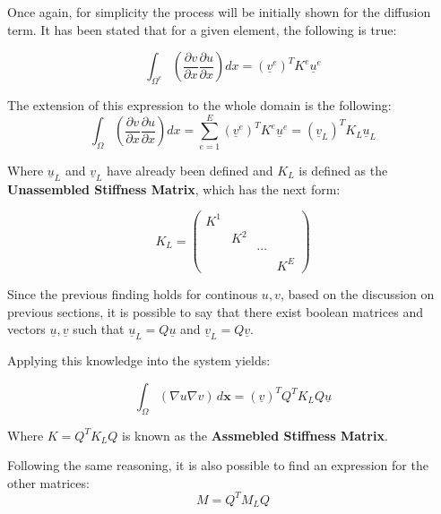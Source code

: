 \documentclass[
]{scrartcl}
\begin{document}
Once again, for simplicity the process will be initially shown for the
diffusion term. It has been stated that for a given element, the
following is true:

\begin{equation}
\int_{\Omega^{e}} ( \frac{\partial v}{\partial x}\frac{\partial u}{\partial x})dx =(\underline{v}^{e})^{T}K^{e}\underline{u}^{e}
\end{equation}

The extension of this expression to the whole domain is the following:
\begin{equation}
    \int_{\Omega} ( \frac{\partial v}{\partial x}\frac{\partial u}{\partial x})dx = \sum_{e=1}^{E} (\underline{v}^{e})^{T}K^{e}\underline{u}^{e} = (\underline{v}_L)^{T}K_L\underline{u}_L    
\end{equation}

Where \(\underline{u}_L\) and \(\underline{v}_L\) have already been
defined and \(K_L\) is defined as the \textbf{Unassembled Stiffness
Matrix}, which has the next form:

\begin{equation}
        K_L=
        \begin{pmatrix}
        K^1 &           &        & \\
                  & K^2 &        & \\
                  &           & \cdots & \\
                  &           &        & K^{E}
        \end{pmatrix} 
\end{equation}

Since the previous finding holds for continous \(u,v\), based on the
discussion on previous sections, it is possible to say that there exist
boolean matrices and vectors \(\underline{u}, \underline{v}\) such that
\(\underline{u}_L=Q\underline{u}\) and
\(\underline{v}_L=Q\underline{v}\).

Applying this knowledge into the system yields:

\begin{equation}
        \int_{\Omega} (\nabla u \nabla v) \,d\textbf{x} = (\underline{v})^{T}Q^{T}K_LQ\underline{u}    
\end{equation}

Where \(K=Q^{T}K_LQ\) is known as the \textbf{Assmebled Stiffness
Matrix}.

Following the same reasoning, it is also possible to find an expression
for the other matrices: \begin{equation}
M = Q^{T}M_LQ    
\end{equation}
\end{document}
